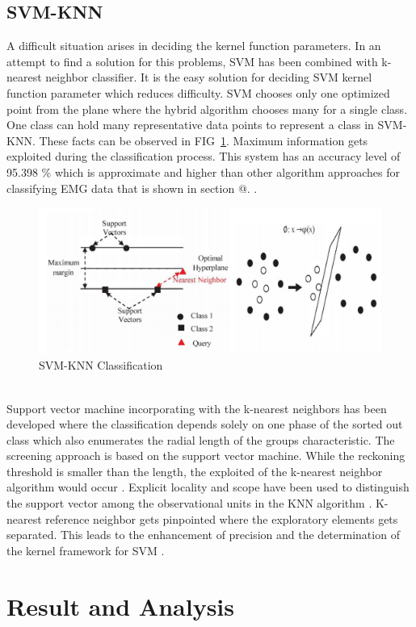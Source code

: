\documentclass[conference]{IEEEtran}
\makeatletter
\newcommand*{\rom}[1]{\expandafter\@slowromancap\romannumeral #1@}
\makeatother
\begin{document}
\subsection{SVM-KNN}
A difficult situation arises in deciding the kernel function parameters. In an attempt to find a solution for this problems, SVM has been combined with k-nearest neighbor classifier. It is the easy solution for deciding SVM kernel function parameter which reduces difficulty. SVM chooses only one optimized point from the plane where the hybrid algorithm chooses many for a single class. One class can hold many representative data points to represent a class in SVM-KNN. These facts can be observed in FIG~\ref{fig:8}. Maximum information gets exploited during the classification process. This system has an accuracy level of 95.398 \% which is approximate and higher than other algorithm approaches for classifying EMG data that is shown in  section \rom{7}.
\cite{article32}.
\begin{figure}[htbp]
 \centerline{\includegraphics[scale=0.65]{Capture5.png}}
 \caption{SVM-KNN Classification}
  \label{fig:8}
\end{figure}\\
Support vector machine incorporating with the k-nearest neighbors has been developed where the classification depends solely on one phase of the sorted out class which also enumerates  the radial length of the groups characteristic. The screening approach is based on the support vector machine. While the reckoning threshold is smaller than the length, the exploited of the k-nearest neighbor algorithm would occur \cite{article32}. Explicit locality and scope have been used to distinguish the support vector among the observational units in the KNN algorithm \cite{article32}. K-nearest reference neighbor gets pinpointed where the exploratory elements gets separated. This leads to the enhancement of precision and the determination of the kernel framework for SVM \cite{article32}.
\
\section{Result and Analysis}
\end{document}
